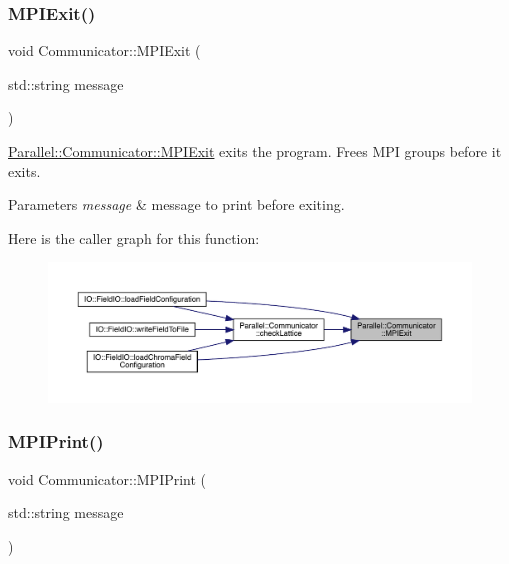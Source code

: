 \subsubsection{\texorpdfstring{MPIExit()}{MPIExit()}}
{\footnotesize\ttfamily void Communicator\+::\+M\+P\+I\+Exit (\begin{DoxyParamCaption}\item[{std\+::string}]{message }\end{DoxyParamCaption})\hspace{0.3cm}{\ttfamily [static]}}



\mbox{\hyperlink{class_parallel_1_1_communicator_a57bb28ee8dbc4efd708a2695423778c4}{Parallel\+::\+Communicator\+::\+M\+P\+I\+Exit}} exits the program. Frees M\+PI groups before it exits. 


\begin{DoxyParams}{Parameters}
{\em message} & message to print before exiting. \\
\hline
\end{DoxyParams}
Here is the caller graph for this function\+:\nopagebreak
\begin{figure}[H]
\begin{center}
\leavevmode
\includegraphics[width=350pt]{class_parallel_1_1_communicator_a57bb28ee8dbc4efd708a2695423778c4_icgraph}
\end{center}
\end{figure}
\mbox{\label{class_parallel_1_1_communicator_a34a1d27c0e2b2b101b97a53734dbc4f8}} 
\subsubsection{\texorpdfstring{MPIPrint()}{MPIPrint()}}
{\footnotesize\ttfamily void Communicator\+::\+M\+P\+I\+Print (\begin{DoxyParamCaption}\item[{std\+::string}]{message }\end{DoxyParamCaption})\hspace{0.3cm}{\ttfamily [static]}}



